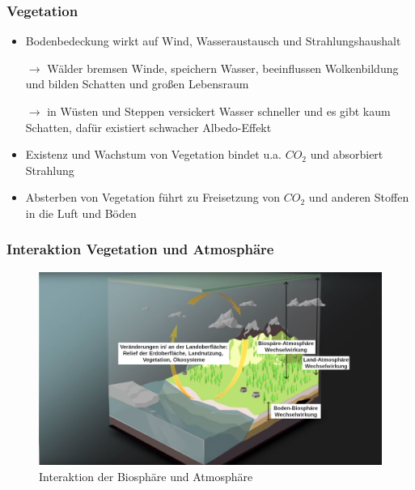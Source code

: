 \begin{frame}
	\frametitle{Vegetation}
		\begin{itemize}
			\item Bodenbedeckung wirkt auf Wind, Wasseraustausch und Strahlungshaushalt
			\item [$\rightarrow$] Wälder bremsen Winde, speichern Wasser, beeinflussen Wolkenbildung und bilden Schatten und großen Lebensraum
			\item [$\rightarrow$] in Wüsten und Steppen versickert Wasser schneller und es gibt kaum Schatten, dafür existiert schwacher Albedo-Effekt
			\item Existenz und Wachstum von Vegetation bindet u.a. $CO_2$ und absorbiert Strahlung
			\item Absterben von Vegetation führt zu Freisetzung von $CO_2$ und anderen Stoffen in die Luft und Böden %
		\end{itemize}
\end{frame}


\begin{frame}
	\frametitle{Interaktion Vegetation und Atmosphäre}
	
		\begin{figure}
		\centering
		\includegraphics{bilder/WMO_Cycles_factors_landAndGround.png}
		\caption{Interaktion der Biosphäre und Atmosphäre}
	\end{figure}

\end{frame}



